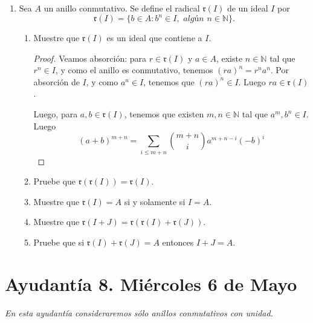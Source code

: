 \documentclass{article}
\theoremstyle{definition}
\theoremstyle{remark}
\numberwithin{equation}{section}
\newcommand{\N}{\mathbb{N}}
\begin{document}
\begin{enumerate}
\begin{proof}
\begin{enumerate}[(a)]
    \item Si $f$ es sobreyectivo.
  \end{enumerate}
\end{proof}

\newcommand{\rr}{\mathfrak{r}}

\item Sea $A$ un anillo conmutativo. Se define el radical $\mathfrak{r}(I)$ de un ideal $I$ por $$\mathfrak{r}(I) = \{ b \in A : b^n \in I, \textit{ alg\'un } n\in \mathbb{N} \}.$$
\begin{enumerate}
    \item Muestre que $\mathfrak{r}(I)$ es un ideal que contiene a $I$.
    \begin{proof}
      Veamos absorción: para $r \in \rr(I)$ y $a \in A$, existe $n\in\N$ tal que $r^n \in I$, y como el anillo es conmutativo, tenemos $(ra)^n = r^n a^n$. Por absorción de $I$, y como $a^n \in I$, tenemos que $(ra)^n \in I$. Luego $ra \in \rr(I)$.

      Luego, para $a,b \in \rr(I)$, tenemos que existen $m,n \in \N$ tal que $a^m, b^n \in I$. Luego 
      \[ (a+b)^{m+n} = \sum_{i \leq m+n} \binom{m+n}{i} a^{m+n-i}(-b)^i \]
    \end{proof}
    \item Pruebe que $\mathfrak{r}(\mathfrak{r}(I)) = \mathfrak{r}(I)$.
    \item Muestre que $\mathfrak{r}(I)=A$ si y solamente si $I=A$.
    \item Muestre que $\mathfrak{r}(I+ J) = \mathfrak{r}(\mathfrak{r}(I) + \mathfrak{r}(J))$.
    \item Pruebe que si $\mathfrak{r}(I) + \mathfrak{r}(J) = A$ entonces $I+ J= A$.
\end{enumerate}

\end{enumerate}


\newpage
\section{Ayudantía 8. Miércoles 6 de Mayo}

\textit{En esta ayudantía consideraremos sólo anillos conmutativos con unidad.}
\end{document}

